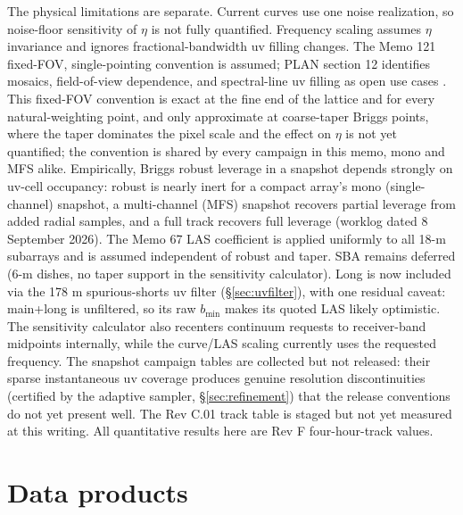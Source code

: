 \documentclass[11pt]{article}
\begin{document}
The physical limitations are separate.  Current curves use one noise
realization, so noise-floor sensitivity of $\eta$ is not fully quantified.
Frequency scaling assumes $\eta$ invariance and ignores fractional-bandwidth uv
filling changes.  The Memo 121 fixed-FOV, single-pointing convention is assumed;
PLAN section 12 identifies mosaics, field-of-view dependence, and spectral-line
uv filling as open use cases \cite{plan}.  This fixed-FOV convention is exact
at the fine end of the lattice and for every natural-weighting point, and only
approximate at coarse-taper Briggs points, where the taper dominates the pixel
scale and the effect on $\eta$ is not yet quantified; the convention is shared
by every campaign in this memo, mono and MFS alike.  Empirically, Briggs
robust leverage in a snapshot depends strongly on uv-cell occupancy: robust
is nearly inert for a compact array's mono (single-channel) snapshot, a
multi-channel (MFS) snapshot recovers partial leverage from added radial
samples, and a full track recovers full leverage (worklog dated 8 September
2026).  The Memo 67 LAS coefficient is
applied uniformly to all 18-m subarrays and is assumed independent of robust
and taper.  SBA remains deferred (6-m dishes, no taper support in the
sensitivity calculator).  Long is now included via the 178 m
spurious-shorts uv filter (\S\ref{sec:uvfilter}), with one residual caveat:
main+long is unfiltered, so its raw $b_{\min}$ makes its quoted LAS likely
optimistic.  The sensitivity calculator also recenters continuum requests to
receiver-band midpoints internally, while the curve/LAS scaling currently uses
the requested frequency.  The snapshot campaign tables are collected but not
released: their sparse instantaneous uv coverage produces genuine
resolution discontinuities (certified by the adaptive sampler,
\S\ref{sec:refinement}) that the release conventions do not yet present
well.  The Rev C.01 track table is staged but not yet measured at this
writing.  All quantitative results here are Rev F four-hour-track values.

\appendix
\section{Data products}
\end{document}
